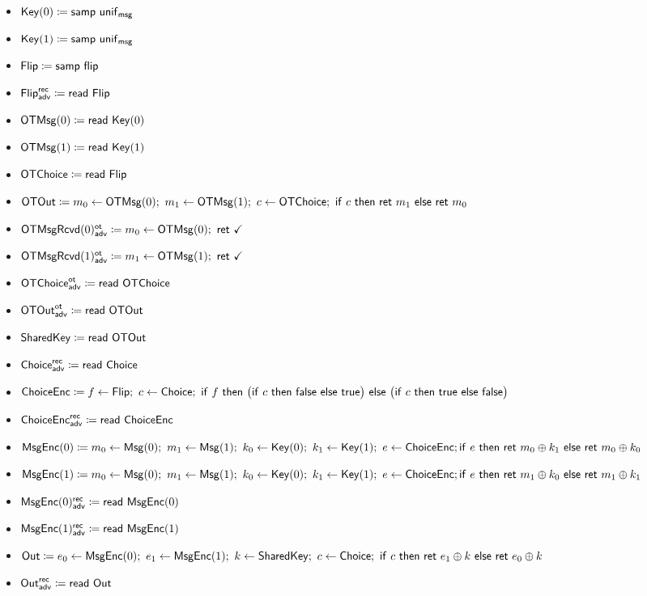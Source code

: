 \begin{itemize}
\item $\mathsf{Key}(0) \coloneqq \mathsf{samp} \ \mathsf{unif}_{\mathsf{msg}}$
\item $\mathsf{Key}(1) \coloneqq \mathsf{samp} \ \mathsf{unif}_{\mathsf{msg}}$
\item $\mathsf{Flip} \coloneqq \mathsf{samp} \ \mathsf{flip}$
\item {\color{blue} $\mathsf{Flip}^{\mathsf{rec}}_{\mathsf{adv}} \coloneqq \mathsf{read} \ \mathsf{Flip}$}
\item $\mathsf{OTMsg}(0) \coloneqq \mathsf{read} \ \mathsf{Key}(0)$
\item $\mathsf{OTMsg}(1) \coloneqq \mathsf{read} \ \mathsf{Key}(1)$
\item $\mathsf{OTChoice} \coloneqq \mathsf{read} \ \mathsf{Flip}$
\item $\OTOut \coloneqq m_0 \leftarrow \OTMsg(0); \ m_1 \leftarrow \OTMsg(1); \ c \leftarrow \OTChoice; \ \ifte{c}{\ret{m_1}}{\ret{m_0}}$
\item {\color{blue} $\LeakOTMsgRcvd(0)^\ot_\adv \coloneqq m_0 \leftarrow \OTMsg(0); \ \ret{\checkmark}$}
\item {\color{blue} $\LeakOTMsgRcvd(1)^\ot_\adv \coloneqq m_1 \leftarrow \OTMsg(1); \ \ret{\checkmark}$}
\item {\color{blue} $\mathsf{OTChoice}^{\mathsf{ot}}_{\mathsf{adv}} \coloneqq \mathsf{read} \ \mathsf{OTChoice}$}
\item {\color{blue} $\mathsf{OTOut}^{\mathsf{ot}}_{\mathsf{adv}} \coloneqq \mathsf{read} \ \mathsf{OTOut}$}
\item $\mathsf{SharedKey} \coloneqq \mathsf{read} \ \mathsf{OTOut}$
\item {\color{blue} $\mathsf{Choice}^{\mathsf{rec}}_{\mathsf{adv}} \coloneqq \mathsf{read} \ \mathsf{Choice}$}
\item $\ChoiceEnc \coloneqq f \leftarrow \Flip; \ c \leftarrow \Choice; \ \ifte{f}{\big(\ifte{c}{\false}{\true}\big)}{\big(\ifte{c}{\true}{\false}\big)}$
\item {\color{blue} $\mathsf{ChoiceEnc}^{\mathsf{rec}}_{\mathsf{adv}} \coloneqq \mathsf{read} \ \mathsf{ChoiceEnc}$}
\item $\mathsf{MsgEnc}(0) \coloneqq m_0 \leftarrow \mathsf{Msg}(0); \ m_1 \leftarrow \mathsf{Msg}(1); \ k_0 \leftarrow \mathsf{Key}(0); \ k_1 \leftarrow \mathsf{Key}(1); \ e \leftarrow \mathsf{ChoiceEnc}; \\ \mathsf{if} \ e \ \mathsf{then} \ \mathsf{ret} \ m_0 \oplus k_1 \ \mathsf{else} \ \mathsf{ret} \ m_0 \oplus k_0$
\item $\mathsf{MsgEnc}(1) \coloneqq m_0 \leftarrow \mathsf{Msg}(0); \ m_1 \leftarrow \mathsf{Msg}(1); \ k_0 \leftarrow \mathsf{Key}(0); \ k_1 \leftarrow \mathsf{Key}(1); \ e \leftarrow \mathsf{ChoiceEnc}; \\ \mathsf{if} \ e \ \mathsf{then} \ \mathsf{ret} \ m_1 \oplus k_0 \ \mathsf{else} \ \mathsf{ret} \ m_1 \oplus k_1$
\item {\color{blue} $\mathsf{MsgEnc}(0)^{\mathsf{rec}}_{\mathsf{adv}} \coloneqq \mathsf{read} \ \mathsf{MsgEnc}(0)$}
\item {\color{blue} $\mathsf{MsgEnc}(1)^{\mathsf{rec}}_{\mathsf{adv}} \coloneqq \mathsf{read} \ \mathsf{MsgEnc}(1)$}
\item $\mathsf{Out} \coloneqq e_0 \leftarrow \mathsf{MsgEnc}(0); \ e_1 \leftarrow \mathsf{MsgEnc}(1); \ k \leftarrow \mathsf{SharedKey}; \ c \leftarrow \mathsf{Choice}; \ \mathsf{if} \ c \ \mathsf{then} \ \mathsf{ret} \ e_1 \oplus k \ \mathsf{else} \ \mathsf{ret} \ e_0 \oplus k$
\item {\color{blue} $\mathsf{Out}^{\mathsf{rec}}_{\mathsf{adv}} \coloneqq \mathsf{read} \ \mathsf{Out}$}
\end{itemize}

